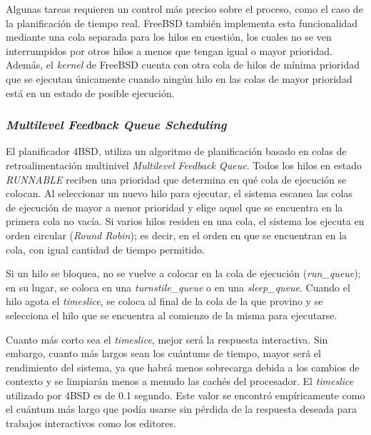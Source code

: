 Algunas tareas requieren un control más preciso sobre el proceso, como el caso de la planificación de tiempo real. FreeBSD también implementa esta funcionalidad mediante una cola separada para los hilos en cuestión, los cuales no se ven interrumpidos por otros hilos a menos que tengan igual o mayor prioridad. Además, el \textit{kernel} de FreeBSD cuenta con otra cola de hilos de mínima prioridad que se ejecutan únicamente cuando ningún hilo en las colas de mayor prioridad está en un estado de posible ejecución.\par

\subsubsection{\textit{Multilevel Feedback Queue Scheduling}}

El planificador 4BSD, utiliza un algoritmo de planificación basado en colas de retroalimentación multinivel \textit{Multilevel Feedback Queue}. Todos los hilos en estado \textit{RUNNABLE} reciben una prioridad que determina en qué cola de ejecución se colocan. Al seleccionar un nuevo hilo para ejecutar, el sistema escanea las colas de ejecución de mayor a menor prioridad y elige aquel que se encuentra en la primera cola no vacía. Si varios hilos residen en una cola, el sistema los ejecuta en orden circular (\textit{Round Robin}); es decir, en el orden en que se encuentran en la cola, con igual cantidad de tiempo permitido.\par

Si un hilo se bloquea, no se vuelve a colocar en la cola de ejecución (\textit{run\_queue}); en su lugar, se coloca en una \textit{turnstile\_queue} o en una \textit{sleep\_queue}. Cuando el hilo agota el \textit{timeslice}, se coloca al final de la cola de la que provino y se selecciona el hilo que se encuentra al comienzo de la misma para ejecutarse.\par

Cuanto más corto sea el \textit{timeslice}, mejor será la respuesta interactiva. Sin embargo, cuanto más largos sean los cuántums de tiempo, mayor será el rendimiento del sistema, ya que habrá menos sobrecarga debida a los cambios de contexto y se limpiarán menos a menudo las cachés del procesador. El \textit{timeslice} utilizado por 4BSD es de 0.1 segundo. Este valor se encontró empíricamente como el cuántum más largo que podía usarse sin pérdida de la respuesta deseada para trabajos interactivos como los editores.\par

